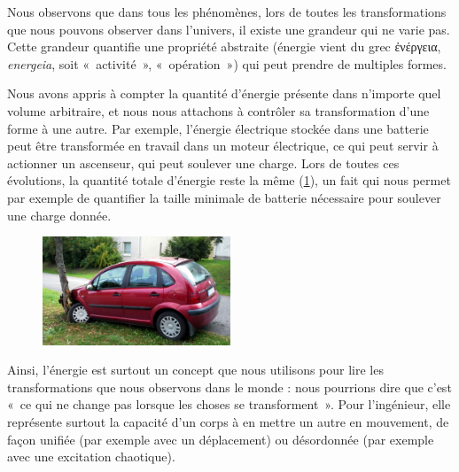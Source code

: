 		Nous observons que dans tous les phénomènes, lors de toutes les transformations que nous pouvons observer dans l’univers, il existe une grandeur qui ne varie pas. Cette grandeur quantifie une propriété abstraite (énergie vient du grec \textgreek{ἐνέργεια}, \textit{energeia}, soit «~activité~», «~opération~») qui peut prendre de multiples formes. %
		
		Nous avons appris à compter la quantité d’énergie présente dans n’importe quel volume arbitraire, et nous nous attachons à contrôler sa transformation d’une forme à une autre. Par exemple, l’énergie électrique stockée dans une batterie peut être transformée en travail dans un moteur électrique, ce qui peut servir à actionner un ascenseur, qui peut soulever une charge. Lors de toutes ces évolutions, la quantité totale d’énergie reste la même (\cref{fig_crashed_car}), un fait qui nous permet par exemple de quantifier la taille minimale de batterie nécessaire pour soulever une charge donnée.
		
		\begin{figure}
			\begin{center}
				\includegraphics[width=0.5\textwidth]{images/crashed_citroen_c3.jpg}
			\end{center}
			\label{fig_crashed_car}
		\end{figure}
		
		Ainsi, l’énergie est surtout un concept que nous utilisons pour lire les transformations que nous observons dans le monde : nous pourrions dire que c’est «~ce qui ne change pas lorsque les choses se transforment~». Pour l’ingénieur, elle représente surtout la capacité d’un corps à en mettre un autre en mouvement, de façon unifiée (par exemple avec un déplacement) ou désordonnée (par exemple avec une excitation chaotique).

